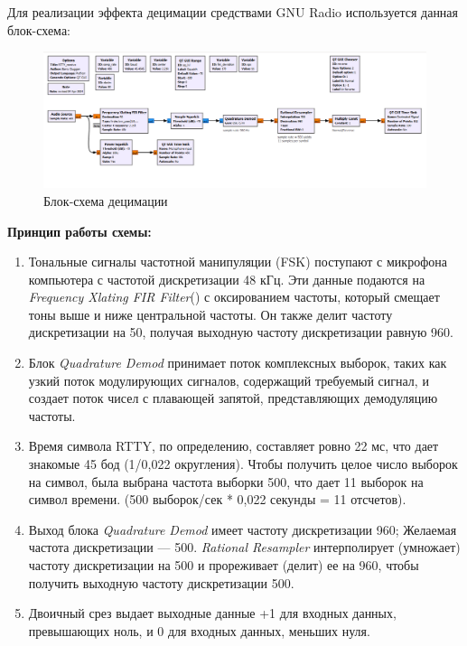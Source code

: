 \documentclass[12pt]{article}
\begin{document}
Для реализации эффекта децимации средствами GNU Radio используется данная блок-схема:
\begin{figure}[H]
    \centering
    \includegraphics[width=1\textwidth]{images/decim-block.png}
    \caption{Блок-схема децимации}
\end{figure}

\textbf{\large Принцип работы схемы:}\medbreak

\begin{enumerate}
    \item Тональные сигналы частотной манипуляции (FSK) поступают с микрофона компьютера с частотой дискретизации 48 кГц.
    Эти данные подаются на \textit{Frequency Xlating FIR Filter}() с оксированием частоты, который смещает тоны выше и ниже центральной частоты.
    Он также делит частоту дискретизации на 50, получая выходную частоту дискретизации равную 960.

    \item Блок \textit{Quadrature Demod} принимает поток комплексных выборок, таких как узкий поток модулирующих сигналов, содержащий требуемый сигнал,
    и создает поток чисел с плавающей запятой, представляющих демодуляцию частоты.

    \item Время символа RTTY, по определению, составляет ровно 22 мс, что дает знакомые 45 бод (1/0,022 округления).
    Чтобы получить целое число выборок на символ, была выбрана частота выборки 500, что дает 11 выборок на символ времени.
    (500 выборок/сек * 0,022 секунды = 11 отсчетов).

    \item Выход блока \textit{Quadrature Demod} имеет частоту дискретизации 960; Желаемая частота дискретизации — 500. \textit{Rational Resampler} интерполирует (умножает)
    частоту дискретизации на 500 и прореживает (делит) ее на 960, чтобы получить выходную частоту дискретизации 500.

    \item Двоичный срез выдает выходные данные +1 для входных данных, превышающих ноль, и 0 для входных данных, меньших нуля.
\end{enumerate}
\end{document}
